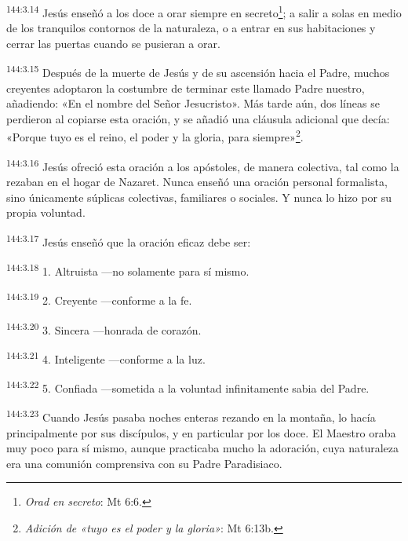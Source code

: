 \par 
\textsuperscript{144:3.14} Jesús enseñó a los doce a orar siempre en secreto\footnote{\textit{Orad en secreto}: Mt 6:6.}; a salir a solas en medio de los tranquilos contornos de la naturaleza, o a entrar en sus habitaciones y cerrar las puertas cuando se pusieran a orar.

\par 
\textsuperscript{144:3.15} Después de la muerte de Jesús y de su ascensión hacia el Padre, muchos creyentes adoptaron la costumbre de terminar este llamado Padre nuestro, añadiendo: «En el nombre del Señor Jesucristo». Más tarde aún, dos líneas se perdieron al copiarse esta oración, y se añadió una cláusula adicional que decía: «Porque tuyo es el reino, el poder y la gloria, para siempre»\footnote{\textit{Adición de «tuyo es el poder y la gloria»}: Mt 6:13b.}.

\par 
\textsuperscript{144:3.16} Jesús ofreció esta oración a los apóstoles, de manera colectiva, tal como la rezaban en el hogar de Nazaret. Nunca enseñó una oración personal formalista, sino únicamente súplicas colectivas, familiares o sociales. Y nunca lo hizo por su propia voluntad.

\par 
\textsuperscript{144:3.17} Jesús enseñó que la oración eficaz debe ser:

\par 
\textsuperscript{144:3.18} 1. Altruista ---no solamente para sí mismo.

\par 
\textsuperscript{144:3.19} 2. Creyente ---conforme a la fe.

\par 
\textsuperscript{144:3.20} 3. Sincera ---honrada de corazón.

\par 
\textsuperscript{144:3.21} 4. Inteligente ---conforme a la luz.

\par 
\textsuperscript{144:3.22} 5. Confiada ---sometida a la voluntad infinitamente sabia del Padre.

\par 
\textsuperscript{144:3.23} Cuando Jesús pasaba noches enteras rezando en la montaña, lo hacía principalmente por sus discípulos, y en particular por los doce. El Maestro oraba muy poco para sí mismo, aunque practicaba mucho la adoración, cuya naturaleza era una comunión comprensiva con su Padre Paradisiaco.

